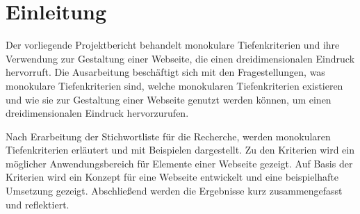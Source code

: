 \section{Einleitung}
Der vorliegende Projektbericht behandelt monokulare Tiefenkriterien und ihre Verwendung zur Gestaltung einer Webseite, die einen dreidimensionalen Eindruck hervorruft. Die Ausarbeitung beschäftigt sich mit den Fragestellungen, was monokulare Tiefenkriterien sind, welche monokularen Tiefenkriterien existieren und wie sie zur Gestaltung einer Webseite genutzt werden können, um einen dreidimensionalen Eindruck hervorzurufen.

Nach Erarbeitung der Stichwortliste für die Recherche, werden monokularen Tiefenkriterien erläutert und mit Beispielen dargestellt. Zu den Kriterien wird ein möglicher Anwendungsbereich für Elemente einer Webseite gezeigt. Auf Basis der Kriterien wird ein Konzept für eine Webseite entwickelt und eine beispielhafte Umsetzung gezeigt. Abschließend werden die Ergebnisse kurz zusammengefasst und reflektiert.

